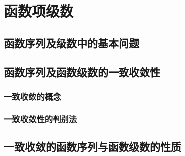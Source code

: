 

\chapter{函数项级数}\label{ch:12}
\section{函数序列及级数中的基本问题}
\section{函数序列及函数级数的一致收敛性}
\subsection{一致收敛的概念}
\subsection{一致收敛性的判别法}
\begin{exercise}

\end{exercise}
\section{一致收敛的函数序列与函数级数的性质}
\begin{exercise}

\end{exercise}
\begin{exercise*}

\end{exercise*}




\endinput
